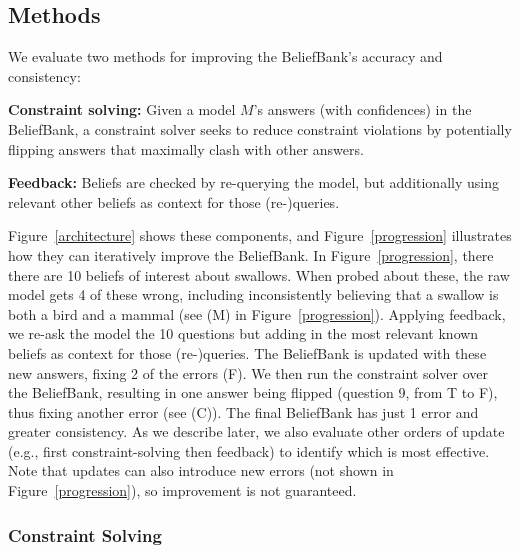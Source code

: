 \documentclass[11pt]{article}
\newenvironment{des}{                 %
     \parskip 0cm \begin{list}{}{\parsep 0cm \itemsep 0cm \topsep 0cm}}{
       \end{list}} %
\begin{document}
\subsection{Methods}

We evaluate two methods for improving the BeliefBank's accuracy and consistency:
\begin{des}
\item[{\bf Constraint solving:}] Given a model $M$'s answers (with confidences) in the BeliefBank, a constraint
solver seeks to reduce constraint violations by potentially flipping answers that maximally clash
with other answers. 
\item[{\bf Feedback:}] Beliefs are checked by re-querying the model, but additionally
using relevant other beliefs as context for those (re-)queries. 
\end{des}
\vspace{1mm}
Figure~\ref{architecture} shows these components, and 
Figure~\ref{progression} illustrates how they can iteratively improve the BeliefBank.
In Figure~\ref{progression}, there there are 10 beliefs of interest about swallows. When probed about these, the raw model 
gets 4 of these wrong, including inconsistently believing that a swallow is both a bird and a mammal
(see (M) in Figure~\ref{progression}). Applying feedback, we re-ask the model the 10 questions but adding 
in the most relevant known beliefs as context for those (re-)queries. The BeliefBank is updated with
these new answers, fixing 2 of the errors (F). We then run the constraint solver over the BeliefBank,
resulting in one answer being flipped (question 9, from T to F), thus fixing another error (see (C)). 
The final BeliefBank has just 1 error and greater consistency.  As we describe later, we also
evaluate other orders of update (e.g., first constraint-solving then feedback) to identify which
is most effective. Note that updates can also 
introduce new errors (not shown in Figure~\ref{progression}), so improvement is not guaranteed. 

\subsubsection{Constraint Solving}
\end{document}

